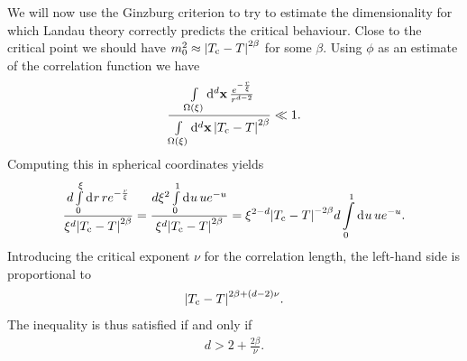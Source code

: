 We will now use the Ginzburg criterion to try to estimate the dimensionality for which Landau theory correctly predicts the critical behaviour. Close to the critical point we should have $m_{0}^{2} \approx \abs{T_{\text{c}} - T}^{2\beta}$ for some $\beta$. Using $\phi$ as an estimate of the correlation function we have
\begin{align*}
	\frac{\integ[d]{\Omega(\xi)}{}{\vb{x}}{\frac{e^{-\frac{r}{\xi}}}{r^{d - 2}}}}{\integ[d]{\Omega(\xi)}{}{\vb{x}}{\abs{T_{\text{c}} - T}^{2\beta}}} \ll 1.
\end{align*}
Computing this in spherical coordinates yields
\begin{align*}
	\frac{d\integ{0}{\xi}{r}{re^{-\frac{r}{\xi}}}}{\xi^{d}\abs{T_{\text{c}} - T}^{2\beta}} = \frac{d\xi^{2}\integ{0}{1}{u}{ue^{-u}}}{\xi^{d}\abs{T_{\text{c}} - T}^{2\beta}} = \xi^{2 - d}\abs{T_{\text{c}} - T}^{-2\beta}d\integ{0}{1}{u}{ue^{-u}}.
\end{align*}
Introducing the critical exponent $\nu$ for the correlation length, the left-hand side is proportional to
\begin{align*}
	\abs{T_{\text{c}} - T}^{2\beta + (d - 2)\nu}.
\end{align*}
The inequality is thus satisfied if and only if
\begin{align*}
	d > 2 + \frac{2\beta}{\nu}.
\end{align*}